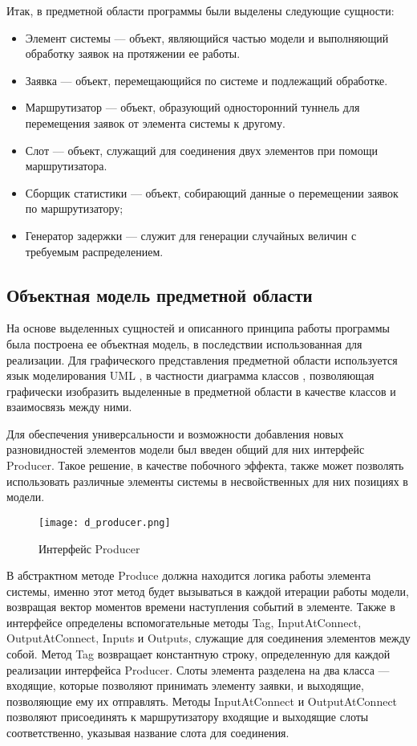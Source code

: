 Итак, в предметной области программы были выделены следующие сущности:
\begin{itemize}
	\item Элемент системы --- объект, являющийся частью модели и выполняющий обработку заявок на протяжении ее работы.
	\item Заявка --- объект, перемещающийся по системе и подлежащий обработке.
	\item Маршрутизатор --- объект, образующий односторонний туннель для перемещения заявок от элемента системы к другому.
	\item Слот --- объект, служащий для соединения двух элементов при помощи маршрутизатора.
	\item Сборщик статистики --- объект, собирающий данные о перемещении заявок по маршрутизатору;
	\item Генератор задержки --- служит для генерации случайных величин с требуемым распределением.
\end{itemize}

\subsection{Объектная модель предметной области}
На основе выделенных сущностей и описанного принципа работы программы была построена ее объектная модель, в последствии использованная для реализации. Для графического представления предметной области используется язык моделирования UML \cite{pilone2005uml}, в частности диаграмма классов \cite{herchi2012user}, позволяющая графически изобразить выделенные в предметной области в качестве классов и взаимосвязь между ними.

Для обеспечения универсальности и возможности добавления новых разновидностей элементов модели был введен общий для них интерфейс Producer. Такое решение, в качестве побочного эффекта, также может позволять использовать различные элементы системы в несвойственных для них позициях в модели.
\begin{figure}[H]
	\centering
	\texttt{[image: d\_producer.png]}
	\caption{Интерфейс Producer}
	\label{d_producer}
\end{figure}

В абстрактном методе Produce должна находится логика работы элемента системы, именно этот метод будет вызываться в каждой итерации работы модели, возвращая вектор моментов времени наступления событий в элементе. Также в интерфейсе определены вспомогательные методы Tag, InputAtConnect, OutputAtConnect, Inputs и Outputs, служащие для соединения элементов между собой. Метод Tag возвращает константную строку, определенную для каждой реализации интерфейса Producer. Слоты элемента разделена на два класса --- входящие, которые позволяют принимать элементу заявки, и выходящие, позволяющие ему их отправлять. Методы InputAtConnect и OutputAtConnect позволяют присоединять к маршрутизатору входящие и выходящие слоты соответственно, указывая название слота для соединения. 

